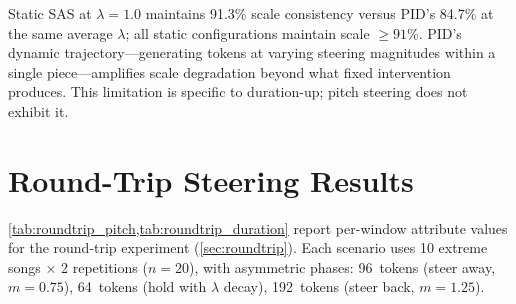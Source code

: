 \documentclass{article}
\theoremstyle{plain}
\begin{document}
Static SAS at $\lambda{=}1.0$ maintains 91.3\% scale consistency versus PID's 84.7\% at the same average $\lambda$; all static configurations maintain scale ${\geq}91\%$. PID's dynamic trajectory---generating tokens at varying steering magnitudes within a single piece---amplifies scale degradation beyond what fixed intervention produces. This limitation is specific to duration-up; pitch steering does not exhibit it.

\section{Round-Trip Steering Results}
\label{app:roundtrip}

\cref{tab:roundtrip_pitch,tab:roundtrip_duration} report per-window attribute values for the round-trip experiment (\cref{sec:roundtrip}). Each scenario uses 10 extreme songs $\times$ 2 repetitions ($n{=}20$), with asymmetric phases: 96~tokens (steer away, $m{=}0.75$), 64~tokens (hold with $\lambda$ decay), 192~tokens (steer back, $m{=}1.25$).

\begin{table}[h]
  \caption{Round-trip pitch steering: per-window mean pitch (st). Recovery error is $|\text{W3} - \text{baseline W3}|$. Release stops steering in Phase~3 ($\lambda{=}0$).}
  \label{tab:roundtrip_pitch}
  \begin{center}
  \end{center}
\end{table}
\end{document}
